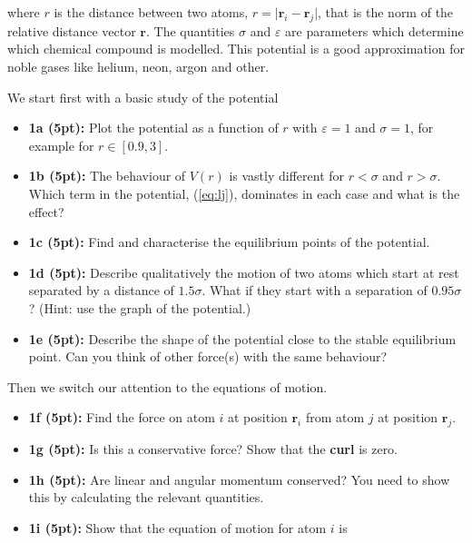 \documentclass[%
oneside,                 %
final,                   %
10pt]{article}
\begin{document}
where $r$ is the distance between two atoms,
$r=\vert\bm{r}_i-\bm{r}_j\vert$, that is the norm of the relative
distance vector $\bm{r}$. The quantities $\sigma$ and $\varepsilon$ are
parameters which determine which chemical compound is modelled. This
potential is a good approximation for noble gases like helium, neon, argon and other.

We start first with a basic study of the potential

\begin{itemize}
\item \textbf{1a (5pt):} Plot the potential as a function of $r$ with $\varepsilon=1$ and $\sigma=1$, for example for $r \in [0.9,3]$.

\item \textbf{1b (5pt):} The behaviour of $V(r)$ is vastly different for $r < \sigma$ and $r > \sigma$. Which term in the potential, (\ref{eq:lj}), dominates in each case and what is the effect?

\item \textbf{1c (5pt):} Find and characterise the equilibrium points of the potential.

\item \textbf{1d (5pt):} Describe qualitatively the motion of two atoms which start at rest separated by a distance of ${1.5}\sigma$. What if they start with a separation of ${0.95}\sigma$?  (Hint: use the graph of the potential.)

\item \textbf{1e (5pt):} Describe the shape of the potential close to the stable equilibrium point. Can you think of other force(s) with the same behaviour?
\end{itemize}

\noindent
Then we switch our attention to the equations of motion.

\begin{itemize}
\item \textbf{1f (5pt):} Find the force on atom $i$ at position $\bm{r}_i$ from atom $j$ at position $\bm{r}_j$.

\item \textbf{1g (5pt):}  Is this a conservative force? Show that the \textbf{curl} is zero.

\item \textbf{1h (5pt):}  Are linear and angular momentum conserved? You need to show this by calculating the relevant quantities.

\item \textbf{1i (5pt):} Show that the equation of motion for atom $i$ is
\end{itemize}
\end{document}
